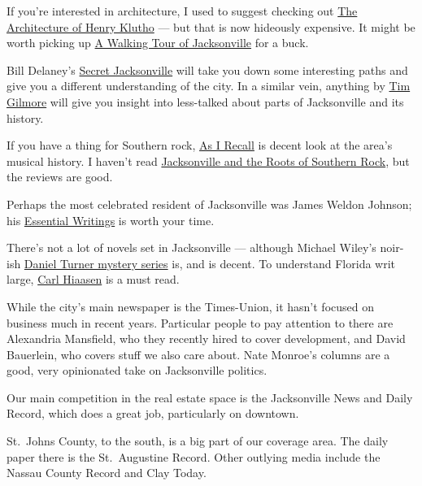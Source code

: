 \documentclass[
  12pt,
  american,
  letterpaperpaper,
  extrafontsizes,onecolumn,openright
  ]{memoir}
\newlength{\rf}
\begin{document}
If you're interested in architecture, I used to suggest checking out \href{https://www.amazon.com/Architecture-Henry-John-Klutho-Jacksonville/dp/0813007313/ref=sr_1_1}{The Architecture of Henry Klutho} --- but that is now hideously expensive. It might be worth picking up \href{https://www.amazon.com/Walking-Tour-Jacksonville-Florida-America-ebook/dp/B005C470GG/ref=sr_1_4}{A Walking Tour of Jacksonville} for a buck.

Bill Delaney's \href{https://www.amazon.com/Secret-Jacksonville-Guide-Wonderful-Obscure/dp/1681063344/ref=sr_1_1}{Secret Jacksonville} will take you down some interesting paths and give you a different understanding of the city. In a similar vein, anything by \href{https://www.amazon.com/stores/Tim-Gilmore/author/B00908FHS8}{Tim Gilmore} will give you insight into less-talked about parts of Jacksonville and its history.

If you have a thing for Southern rock, \href{https://www.amazon.com/As-Recall-Jacksonvilles-American-History/dp/1530443024/ref=sr_1_1}{As I Recall} is decent look at the area's musical history. I haven't read \href{https://www.amazon.com/Jacksonville-Roots-Southern-Michael-FitzGerald/dp/0813080355/ref=sr_1_2}{Jacksonville and the Roots of Southern Rock}, but the reviews are good.

Perhaps the most celebrated resident of Jacksonville was James Weldon Johnson; his \href{https://www.amazon.com/Essential-Writings-Johnson-Library-Classics/dp/0812975324/ref=sr_1_1}{Essential Writings} is worth your time.

There's not a lot of novels set in Jacksonville --- although Michael Wiley's noir-ish \href{https://www.amazon.com/dp/B07PLPNSCH}{Daniel Turner mystery series} is, and is decent. To understand Florida writ large, \href{https://www.amazon.com/stores/Carl-Hiaasen/author/B00KWZGGAG}{Carl Hiaasen} is a must read.

While the city's main newspaper is the Times-Union, it hasn't focused on business much in recent years. Particular people to pay attention to there are Alexandria Mansfield, who they recently hired to cover development, and David Bauerlein, who covers stuff we also care about. Nate Monroe's columns are a good, very opinionated take on Jacksonville politics.

Our main competition in the real estate space is the Jacksonville News and Daily Record, which does a great job, particularly on downtown.

St.~Johns County, to the south, is a big part of our coverage area. The daily paper there is the St.~Augustine Record. Other outlying media include the Nassau County Record and Clay Today.
\end{document}
